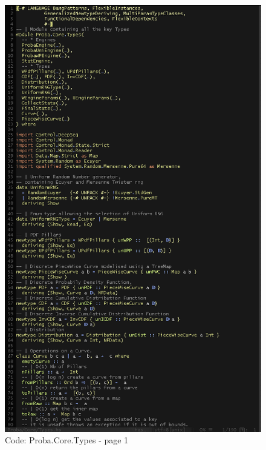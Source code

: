 \documentclass[12pt,a4paper,titlepage]{article}
\begin{document}
\begin{figure}[h!]
\centering
\includegraphics[width=1\textwidth]{img/code-types-1.png}
\caption{Code: Proba.Core.Types - page 1}
\label{fig:core.types1}
\end{figure}
\end{document}
